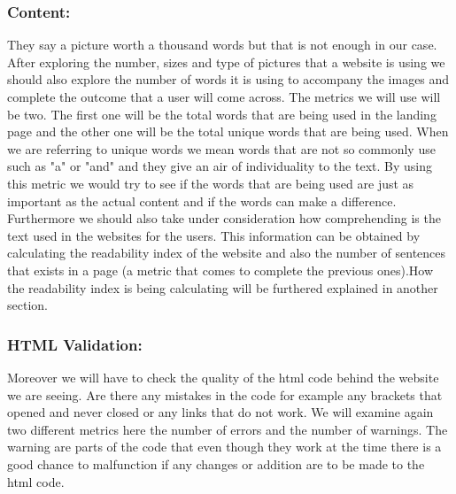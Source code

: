 \documentclass{article}
\begin{document}
\subsubsection{Content:} They say a picture worth a thousand words but that is not enough in our case. After exploring the number, sizes and type of pictures that a website is using we should also explore the number of words it is using to accompany the images and complete the outcome that a user will come across. The metrics we will use will be two. The first one will be the total words that are being used in the landing page and the other one will be the total unique words that are being used. When we are referring to unique words we mean words that are not so commonly use such as "a" or "and" and they give an air of individuality to the text. By using this metric we would try to see if the words that are being used are just as important as the actual content and if the words can make a difference.\\
Furthermore we should also take under consideration how comprehending is the text used in the websites for the users. This information can be obtained by calculating the readability index of the website and also the number of sentences that exists in a page (a metric that comes to complete the previous ones).How the readability index is being calculating will be furthered explained in another section.
\subsubsection{HTML Validation:} Moreover we will have to check the quality of the html code behind the website we are seeing. Are there any mistakes in the code for example any brackets that opened and never closed or any links that do not work. We will examine again two different metrics here the number of errors and the number of warnings. The warning are parts of the code that even though they work at the time there is a good chance to malfunction if any changes or addition are to be made to the html code. 
\end{document}
